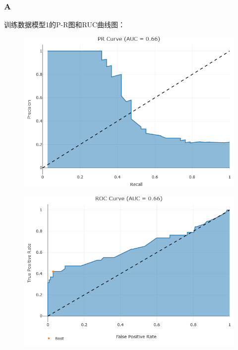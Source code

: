 \documentclass[12pt,a4paper]{article}
\begin{document}
    \title{}
    \date{}
    \author{姓名：\underline{刘哲}~~~~~~学号：\underline{2022103691}~~~~~~}
    \maketitle
    \section{}
    \vspace{10pt}
    \subsubsection*{A}
    训练数据模型1的P-R图和RUC曲线图：
    \begin{figure}[H]
        \centering
        \includegraphics[scale=0.65]{TrainPR1.png}
    \end{figure}
    \begin{figure}[H]
        \centering
        \includegraphics[scale=0.65]{TrainROC1.png}
    \end{figure}
\end{document}
